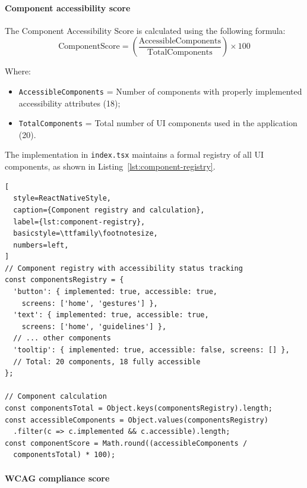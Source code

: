 \pagebreak

\newpage

\paragraph{Component accessibility score}

The Component Accessibility Score is calculated using the following formula:
\begin{equation}
\text{ComponentScore} 
= \left(\frac{\text{AccessibleComponents}}{\text{TotalComponents}}\right) \times 100
\end{equation}

Where:
\begin{itemize}
    \item \texttt{AccessibleComponents} = Number of components with properly implemented accessibility attributes (18);
    \item \texttt{TotalComponents} = Total number of UI components used in the application (20).
\end{itemize}

The implementation in \texttt{index.tsx} maintains a formal registry of all UI components, as shown in Listing~\ref{lst:component-registry}.

\begin{lstlisting}[
  style=ReactNativeStyle,
  caption={Component registry and calculation},
  label={lst:component-registry},
  basicstyle=\ttfamily\footnotesize,
  numbers=left,
]
// Component registry with accessibility status tracking
const componentsRegistry = {
  'button': { implemented: true, accessible: true, 
    screens: ['home', 'gestures'] },
  'text': { implemented: true, accessible: true, 
    screens: ['home', 'guidelines'] },
  // ... other components
  'tooltip': { implemented: true, accessible: false, screens: [] },
  // Total: 20 components, 18 fully accessible
};

// Component calculation
const componentsTotal = Object.keys(componentsRegistry).length;
const accessibleComponents = Object.values(componentsRegistry)
  .filter(c => c.implemented && c.accessible).length;
const componentScore = Math.round((accessibleComponents / 
  componentsTotal) * 100);
\end{lstlisting}

\paragraph{WCAG compliance score}

